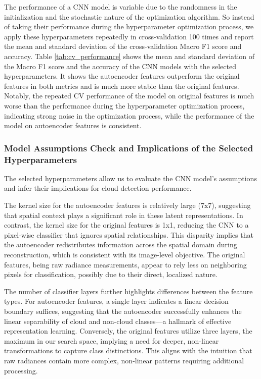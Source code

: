 \documentclass[10pt,letterpaper]{article}
\begin{document}
The performance of a CNN model is variable due to the randomness in the initialization and the stochastic nature of the optimization algorithm. So instead of taking their performance during the hyperparameter optimization process, we apply these hyperparameters repeatedly in cross-validation 100 times and report the mean and standard deviation of the cross-validation Macro F1 score and accuracy. Table \ref{tab:cv_performance} shows the mean and standard deviation of the Macro F1 score and the accuracy of the CNN models with the selected hyperparameters. It shows the autoencoder features outperform the original features in both metrics and is much more stable than the original features. Notably, the repeated CV performance of the model on original features is much worse than the performance during the hyperparameter optimization process, indicating strong noise in the optimization process, while the performance of the model on autoencoder features is consistent.

\subsubsection{Model Assumptions Check and Implications of the Selected Hyperparameters}

The selected hyperparameters allow us to evaluate the CNN model's assumptions and infer their implications for cloud detection performance.

The kernel size for the autoencoder features is relatively large (7x7), suggesting that spatial context plays a significant role in these latent representations. In contrast, the kernel size for the original features is 1x1, reducing the CNN to a pixel-wise classifier that ignores spatial relationships. This disparity implies that the autoencoder redistributes information across the spatial domain during reconstruction, which is consistent with its image-level objective. The original features, being raw radiance measurements, appear to rely less on neighboring pixels for classification, possibly due to their direct, localized nature.

The number of classifier layers further highlights differences between the feature types. For autoencoder features, a single layer indicates a linear decision boundary suffices, suggesting that the autoencoder successfully enhances the linear separability of cloud and non-cloud classes—a hallmark of effective representation learning. Conversely, the original features utilize three layers, the maximum in our search space, implying a need for deeper, non-linear transformations to capture class distinctions. This aligns with the intuition that raw radiances contain more complex, non-linear patterns requiring additional processing.
\end{document}
